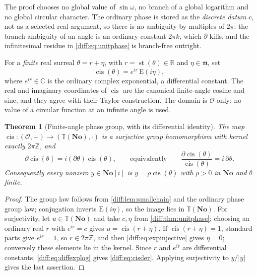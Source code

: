 \documentclass[11pt,letterpaper]{article}
\numberwithin{equation}{section}
\newtheorem{theorem}{Theorem}[section]
\theoremstyle{definition}
\theoremstyle{remark}
\newcommand{\No}{\mathbf{No}}
\newcommand{\SC}{\mathbf{No}[i]}
\newcommand{\R}{\mathbb R}
\newcommand{\C}{\mathbb C}
\newcommand{\Z}{\mathbb Z}
\newcommand{\der}{\partial}
\newcommand{\Ofin}{\mathcal O}
\newcommand{\mm}{\mathfrak m}
\newcommand{\st}{\operatorname{st}}
\newcommand{\cis}{\operatorname{cis}}
\newcommand{\Emm}{\mathrm{E}}
\newcommand{\Tor}{\mathbb T}
\newcommand{\abs}[1]{\lvert#1\rvert}
\begin{document}
The proof chooses no global value of $\sin\omega$, no branch of a global
logarithm and no global circular character. The ordinary phase is stored as the
\emph{discrete datum} $c$, not as a selected real argument, so there is no
ambiguity by multiples of $2\pi$: the branch ambiguity of an angle is an
ordinary constant $2\pi k$, which $\der$ kills, and the infinitesimal residue
in \cref{diff:eq:unitphase} is branch-free outright.

\begin{definition}
\label{diff:def:cis}
For a \emph{finite} real surreal $\theta=r+\eta$, with $r=\st(\theta)\in\R$
and $\eta\in\mm$, set
\[
 \cis(\theta)=e^{ir}\,\Emm(i\eta),
\]
where $e^{ir}\in\C$ is the ordinary complex exponential, a differential
constant. The real and imaginary coordinates of $\cis$ are the canonical
finite-angle cosine and sine, and they agree with their Taylor construction.
The domain is $\Ofin$ only; no value of a circular function at an infinite
angle is used.
\end{definition}

\begin{theorem}[Finite-angle phase group, with its differential identity]
\label{diff:thm:cisgroup}
The map $\cis:(\Ofin,+)\to(\Tor(\No),\cdot)$ is a surjective group
homomorphism with kernel exactly $2\pi\Z$, and
\begin{equation}\label{diff:eq:cisder}
 \der\cis(\theta)=i(\der\theta)\cis(\theta),
 \qquad\text{equivalently}\qquad
 \frac{\der\cis(\theta)}{\cis(\theta)}=i\,\der\theta .
\end{equation}
Consequently every nonzero $y\in\SC$ is $y=\rho\cis(\theta)$ with $\rho>0$ in
$\No$ and $\theta$ \emph{finite}.
\end{theorem}
\begin{proof}
The group law follows from \cref{diff:lem:smallchain} and the ordinary phase
group law; conjugation inverts $\Emm(i\eta)$, so the image lies in
$\Tor(\No)$. For surjectivity, let $u\in\Tor(\No)$ and take $c,\eta$ from
\cref{diff:thm:unitphase}; choosing an ordinary real $r$ with $e^{ir}=c$ gives
$u=\cis(r+\eta)$. If $\cis(r+\eta)=1$, standard parts give $e^{ir}=1$, so
$r\in2\pi\Z$, and then \cref{diff:eq:expinjective} gives $\eta=0$; conversely
these elements lie in the kernel. Since $r$ and $e^{ir}$ are differential
constants, \cref{diff:eq:diffexplog} gives \cref{diff:eq:cisder}. Applying
surjectivity to $y/\abs y$ gives the last assertion.
\end{proof}
\end{document}
